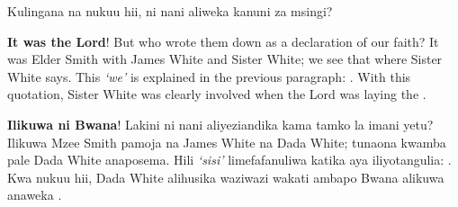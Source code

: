 Kulingana na nukuu hii, ni nani aliweka kanuni za msingi?


 \textbf{It was the Lord}! But who wrote them down as a declaration of our faith? It was Elder Smith with James White and Sister White; we see that where Sister White says. This \textit{‘we’} is explained in the previous paragraph: . With this quotation, Sister White was clearly involved when the Lord was laying the .


 \textbf{Ilikuwa ni Bwana}! Lakini ni nani aliyeziandika kama tamko la imani yetu? Ilikuwa Mzee Smith pamoja na James White na Dada White; tunaona kwamba pale Dada White anaposema. Hili \textit{‘sisi’} limefafanuliwa katika aya iliyotangulia: . Kwa nukuu hii, Dada White alihusika waziwazi wakati ambapo Bwana alikuwa anaweka .


